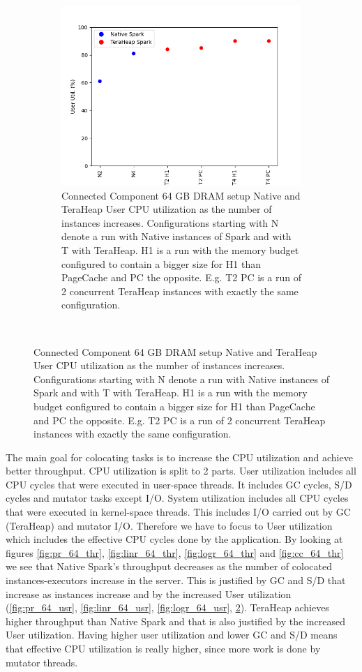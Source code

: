 \begin{figure}[htbp]
\begin{subfigure}[b]{0.48\textwidth}
        \includegraphics[width=\linewidth]{./fig/CC_64_USR.png}
    \caption{Connected Component 64 GB DRAM setup Native and TeraHeap
    User CPU utilization as the number of instances increases. Configurations
    starting with N denote a run with Native instances of Spark and
    with T with TeraHeap. H1 is a run with the memory budget
    configured to contain a bigger size for H1 than PageCache and PC
    the opposite. E.g. T2 PC is a run of 2 concurrent TeraHeap
    instances with exactly the same configuration.}
	\label{fig:cc_64_usr}
\end{subfigure}\\[1em]
\end{figure}


The main goal for colocating tasks is to increase the CPU utilization and achieve better
throughput. CPU utilization is split to 2 parts. 
User utilization includes all CPU cycles that were executed in user-space threads.
It includes GC cycles, S/D cycles and mutator tasks except I/O.
System utilization includes all CPU cycles that were executed in kernel-space threads.
This includes I/O carried out by GC (TeraHeap) and mutator I/O.
Therefore we have to focus to User utilization which includes the effective CPU cycles done by the application.
By looking at figures \ref{fig:pr_64_thr}, \ref{fig:linr_64_thr},
\ref{fig:logr_64_thr} and \ref{fig:cc_64_thr} we see that Native
Spark's throughput decreases as the number of colocated
instances-executors increase in the server.
This is justified by GC and S/D that increase as instances increase and by the increased User utilization
(\ref{fig:pr_64_usr}, \ref{fig:linr_64_usr}, \ref{fig:logr_64_usr}, \ref{fig:cc_64_usr}).
TeraHeap achieves higher throughput than Native Spark and that is also justified by the increased User utilization.
Having higher user utilization and lower GC and S/D means that effective CPU utilization is really higher, since more
work is done by mutator threads.

